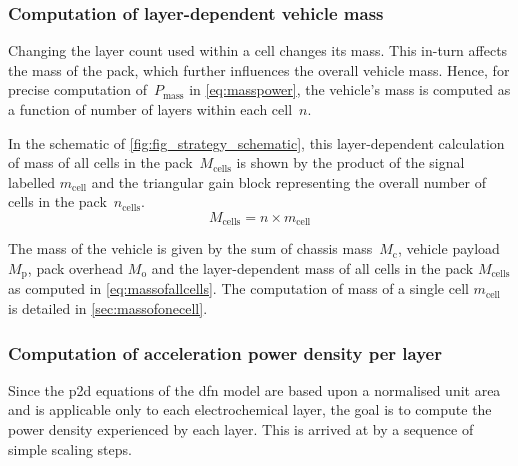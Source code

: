 \subsubsection*{Computation of layer-dependent vehicle mass}\label{sec:layerdependentvehiclemass}

Changing  the layer  count used  within a  cell changes  its mass.  This in-turn
affects the mass of the pack, which further influences the overall vehicle mass.
Hence, for  precise computation  of~$P_\text{mass}$ in  \cref{eq:masspower}, the
vehicle's  mass is  computed  as a  function  of number  of  layers within  each
cell~$n$.

In  the  schematic  of \cref{fig:fig_strategy_schematic},  this  layer-dependent
calculation of  mass of all cells  in the pack~$M_\text{cells}$ is  shown by the
product of  the signal  labelled $m_\text{cell}$ and  the triangular  gain block
representing the overall number of cells in the pack~$n_\text{cells}$.
\begin{equation}\label{eq:massofallcells}
    M_\text{cells} = n \times m_\text{cell}
\end{equation}

The  mass of  the vehicle  is  given by  the sum  of chassis  mass~$M_\text{c}$,
vehicle payload $M_\text{p}$, pack overhead $M_\text{o}$ and the layer-dependent
mass   of   all   cells   in   the  pack   $M_\text{cells}$   as   computed   in
\cref{eq:massofallcells}.   The   computation  of   mass   of   a  single   cell
$m_\text{cell}$ is detailed in \cref{sec:massofonecell}.

\subsubsection*{Computation of acceleration power density per layer}

Since the \gls{p2d} equations of the \gls{dfn} model are based upon a normalised
unit area and is  applicable only to each electrochemical layer,  the goal is to
compute the  power density experienced  by each layer. This  is arrived at  by a
sequence of simple scaling steps.

